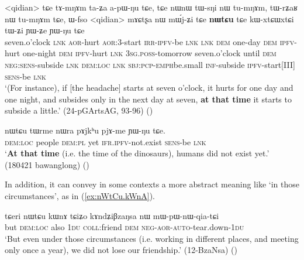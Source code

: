 \begin{exe}
\ex \label{ex:nWtCu.temporal}
\gll <qidian> tɕe tɤ-mŋɤm ta-ʑa a-pɯ-ŋu tɕe, tɕe nɯnɯ tɯ-sŋi nɯ tu-mŋɤm, tɯ-rʑaʁ nɯ tu-mŋɤm tɕe, ɯ-fso <qidian> mɤɕtʂa nɯ mɯ́j-ʑi tɕe \textbf{nɯtɕu} tɕe kɯ-xtɕɯ\redp{}xtɕi tɯ-ʑi ɲɯ-ʑe ɲɯ-ŋu tɕe \\
seven.o'clock \textsc{lnk} \textsc{aor}-hurt \textsc{aor}:3\flobv{}-start \textsc{irr}-\textsc{ipfv}-be \textsc{lnk} \textsc{lnk} \textsc{dem} one-day \textsc{dem} \textsc{ipfv}-hurt  one-night \textsc{dem} \textsc{ipfv}-hurt  \textsc{lnk}  \textsc{3sg}.\textsc{poss}-tomorrow seven.o'clock until \textsc{dem} \textsc{neg}:\textsc{sens}-subside \textsc{lnk} \textsc{dem}:\textsc{loc} \textsc{lnk} \textsc{sbj}:\textsc{pcp}-\textsc{emph}\redp{}be.small \textsc{inf}-subside \textsc{ipfv}-start[III] \textsc{sens}-be \textsc{lnk} \\
\glt `(For instance), if [the headache] starts at seven o'clock, it hurts for one day and one night, and subsides only in the next day at seven, \textbf{at that time} it starts to subside a little.' (24-pGArtsAG, 93-96)
()
\end{exe}

\begin{exe}
\ex \label{ex:nWtCu.temporal2}
\gll  nɯtɕu tɯrme nɯra pɤjkʰu pjɤ-me ɲɯ-ŋu tɕe. \\
\textsc{dem}:\textsc{loc} people \textsc{dem}:\textsc{pl} yet \textsc{ifr}.\textsc{ipfv}-not.exist \textsc{sens}-be \textsc{lnk}  \\
\glt `\textbf{At that time} (i.e. the time of the dinosaurs), humans did not exist yet.' (180421 bawanglong)
()
\end{exe}

In addition, it can convey in some contexts a more abstract meaning like `in those circumstances', as in (\ref{ex:nWtCu.kWnA}).

\begin{exe}
\ex \label{ex:nWtCu.kWnA}
\gll tɕeri nɯtɕu kɯnɤ tɕiʑo kɤndʑiβzaŋsa nɯ mɯ-pɯ-nɯ-qia-tɕi \\
but \textsc{dem}:\textsc{loc} also \textsc{1du} \textsc{coll}:friend \textsc{dem} \textsc{neg}-\textsc{aor}-\textsc{auto}-tear.down-\textsc{1du} \\
\glt `But even under those circumstances (i.e. working in different places, and meeting only once a year), we did not lose our friendship.' (12-BzaNsa) ()
\end{exe}

